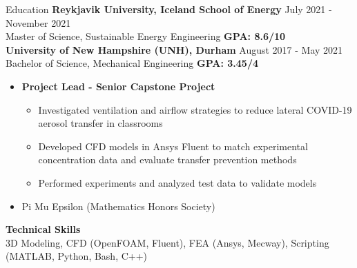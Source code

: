 \documentclass{resume}
\begin{document}
\begin{rSection}{Education}
    {\bf Reykjavik University, Iceland School of Energy} \hfill {July 2021 - November 2021}
    \\ {Master of Science, Sustainable Energy Engineering} \hfill {\bf{GPA: 8.6/10}}
    \\ {\bf University of New Hampshire (UNH), Durham} \hfill {August 2017 - May 2021}
    \\ {Bachelor of Science, Mechanical Engineering} \hfill {\bf GPA: 3.45/4}
    \vspace{-0.5em}
    \begin{itemize}[label={\tiny\raisebox{1ex}{\textbullet}}, noitemsep]
        \item {\bf{Project Lead - Senior Capstone Project}}
              \begin{itemize}[label={\tiny\raisebox{1ex}{\textbullet}}, noitemsep]
                  \item Investigated ventilation and airflow strategies to reduce lateral COVID-19 aerosol transfer in classrooms
                  \item Developed CFD models in Ansys Fluent to match experimental concentration data and evaluate transfer prevention methods
                  \item Performed experiments and analyzed test data to validate models
              \end{itemize}
        \item Pi Mu Epsilon (Mathematics Honors Society)
    \end{itemize}{}
    \vspace{-0.4em}
    {\bf Technical Skills}
    \\ 3D Modeling, CFD (OpenFOAM, Fluent), FEA (Ansys, Mecway), Scripting (MATLAB, Python, Bash, C++)
    \vspace{-0.4em}
\end{rSection}
\end{document}
